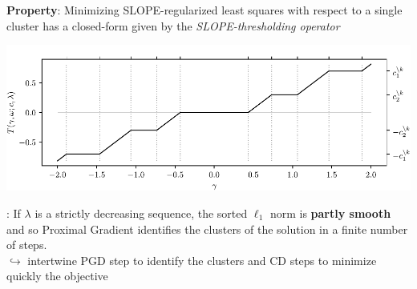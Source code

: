 \documentclass[english,final,t]{beamer}
\begin{document}
\begin{frame}{}
\begin{columns}[t]
\begin{column}{.32\linewidth}
\begin{block}{\textbf{\color{malgared}{\#1 Clusterwise minimization}}}
		\textbf{\textcolor{malgared}{Property}}: Minimizing SLOPE-regularized least squares with respect to a single cluster has a closed-form given by the \emph{SLOPE-thresholding operator}

		\begin{center}
			\includegraphics[width=0.6\linewidth]{images/slope-thresholding}
		\end{center}
		\vspace*{-1cm}
		\end{block}
	\vspace*{-1.5cm}
	\begin{block}{\textbf{\color{malgared}{\#2 Cluster identification}}}
		{\textbf{\color{malgared}{Property}}}: If $\lambda$ is a strictly decreasing sequence, the sorted $\ell_1$ norm is \textbf{partly smooth} and so Proximal Gradient identifies the clusters of the solution in a finite number of steps. \\[0.2em]
		$\hookrightarrow$ intertwine PGD step to identify the clusters and CD steps to minimize quickly the objective
	\end{block}
	\vspace*{-1.5cm}
	\begin{block}{\textbf{\color{malgared}{\#3 Algorithm}}}
		\vspace*{-.5cm}

		\begin{algorithm}[H]
			\caption{%
			  Hybrid coordinate descent and proximal gradient descent algorithm
			  for SLOPE\label{alg:hybrid}}


\end{algorithm}
\end{block}
\end{column}
\end{columns}
\end{frame}
\end{document}
